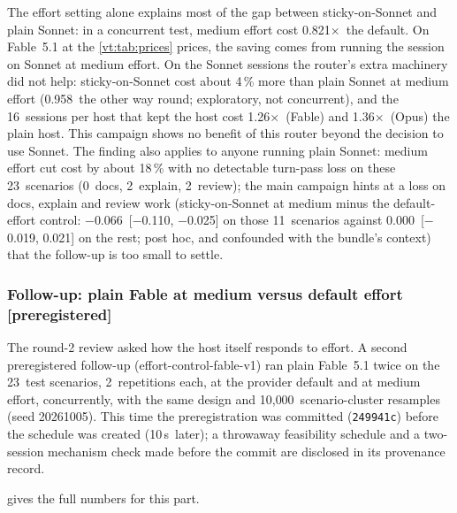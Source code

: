 \documentclass[11pt,letterpaper]{article}
\newcommand{\code}[1]{\texttt{#1}}
\newcommand{\X}{\ensuremath{\times}}
\newcommand{\EcCutPct}{18}
\newcommand{\EcRatio}{0.821}
\newcommand{\EcReps}{2}
\newcommand{\EcResamples}{10{,}000}
\newcommand{\EcScen}{23}
\newcommand{\EcSecGapPct}{4}
\newcommand{\EcSecRatio}{0.958}
\newcommand{\EcSeed}{20261005}
\newcommand{\EfPreregSha}{249941c}
\newcommand{\EfScheduleAfter}{10\,s}
\newcommand{\RvDocsTest}{0}
\newcommand{\RvExplainTest}{2}
\newcommand{\RvKTDtp}{$-$0.066}
\newcommand{\RvKTDtpCI}{$-$0.110, $-$0.025}
\newcommand{\RvKTN}{11}
\newcommand{\RvRestDtp}{0.000}
\newcommand{\RvRestDtpCI}{$-$0.019, 0.021}
\newcommand{\RvReviewTest}{2}
\newcommand{\RvStickyHostFableTwo}{1.26}
\newcommand{\RvStickyHostNFable}{16}
\newcommand{\RvStickyHostOpusTwo}{1.36}
\begin{document}
\begin{keyidea}
The effort setting alone explains most of the gap between sticky-on-Sonnet and plain Sonnet: in a concurrent test,
medium effort cost \EcRatio\X\ the default. On Fable~5.1 at the \cref{vt:tab:prices} prices, the saving comes from
running the session on Sonnet at medium effort. On the Sonnet sessions the router's extra machinery did not help: sticky-on-Sonnet cost about \EcSecGapPct\,\% more
than plain Sonnet at medium effort (\EcSecRatio\ the other way round; exploratory, not concurrent), and the
\RvStickyHostNFable\ sessions per host that kept the host cost \RvStickyHostFableTwo\X\ (Fable) and
\RvStickyHostOpusTwo\X\ (Opus) the plain host. This campaign shows no benefit of this router beyond the decision to use
Sonnet. The finding also applies to anyone running plain Sonnet:
medium effort cut cost by about \EcCutPct\,\% with no detectable turn-pass loss on these \EcScen\ scenarios (\RvDocsTest\ docs, \RvExplainTest\ explain, \RvReviewTest\ review); the main campaign
hints at a loss on docs, explain and review work (sticky-on-Sonnet at medium minus the default-effort control:
\RvKTDtp\ [\RvKTDtpCI] on those \RvKTN\ scenarios against \RvRestDtp\ [\RvRestDtpCI] on the rest; post hoc, and
confounded with the bundle's context) that the follow-up is too small to settle.
\end{keyidea}

\subsubsection{Follow-up: plain Fable at medium versus default effort \texorpdfstring{[preregistered]}{[preregistered]}}\label{vt:sec:effortfable}

The round-2 review asked how the host itself responds to effort. A second preregistered follow-up
(effort-control-fable-v1) ran plain Fable~5.1 twice on the \EcScen\ test scenarios, \EcReps\ repetitions each, at the
provider default and at medium effort, concurrently, with the same design and \EcResamples\ scenario-cluster resamples
(seed \EcSeed). This time the preregistration was committed (\code{\EfPreregSha}) before the schedule was created
(\EfScheduleAfter\ later); a throwaway feasibility schedule and a two-session mechanism check made before the commit
are disclosed in its provenance record.

 gives the full numbers for this part.
\end{document}
